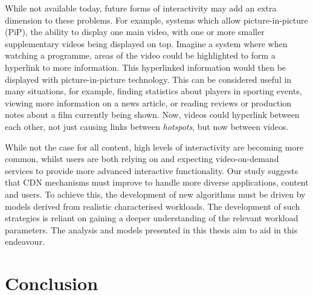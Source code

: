     While not available today, future forms of interactivity may add an extra dimension to these problems. For example, systems which allow picture-in-picture (PiP), the ability to display one main video, with one or more smaller supplementary videos being displayed on top. Imagine a system where when watching a programme, areas of the video could be highlighted to form a hyperlink to more information. This hyperlinked information would then be displayed with picture-in-picture technology. This can be considered useful in many situations, for example, finding statistics about players in sporting events, viewing more information on a news article, or reading reviews or production notes about a film currently being shown. Now, videos could hyperlink between each other, not just causing links between \emph{hotspots}, but now between videos.

    While not the case for all content, high levels of interactivity are becoming more common, whilst users are both relying on and expecting video-on-demand services to provide more advanced interactive functionality. Our study suggests that CDN mechanisms must improve to handle more diverse applications, content and users. To achieve this, the development of new algorithms must be driven by models derived from realistic characterised workloads. The development of such strategies is reliant on gaining a deeper understanding of the relevant workload parameters. The analysis and models presented in this thesis aim to aid in this endeavour.

\section{Conclusion}


